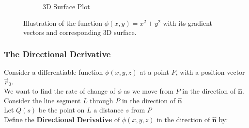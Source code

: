 \documentclass[a4paper, 10pt]{article}
\begin{document}
\begin{figure}[htbp]
\begin{subfigure}{0.45\textwidth}
\begin{tikzpicture}[scale=0.8]
    \end{tikzpicture}
    \caption{3D Surface Plot}
  \end{subfigure}
  \caption{Illustration of the function $\phi(x,y)=x^2+y^2$ with its gradient vectors and corresponding 3D surface.}
\end{figure}




\pagebreak

\subsubsection{The Directional Derivative}
\noindent\begin{minipage}{0.8\textwidth}
  Consider a differentiable function $\phi(x,y,z)$ at a point $P$, with a position vector $\vec{r}_0$.  \\
  We want to find the rate of change of $\phi$ as we move from $P$ in the direction of $\hat{\mathbf{n}}$. \\
  Consider the line segment $L$ through $P$ in the direction of $\hat{\mathbf{n}}$ \\
  Let $Q(s)$ be the point on $L$ a distance $s$ from $P$ \\
  Define the \textbf{Directional Derivative} of $\phi(x,y,z)$ in the direction of $\hat{\mathbf{n}}$ by:
\end{minipage}
\begin{minipage}{0.2\textwidth}
  \begin{center}
  \end{center}
\end{minipage}
\end{document}
